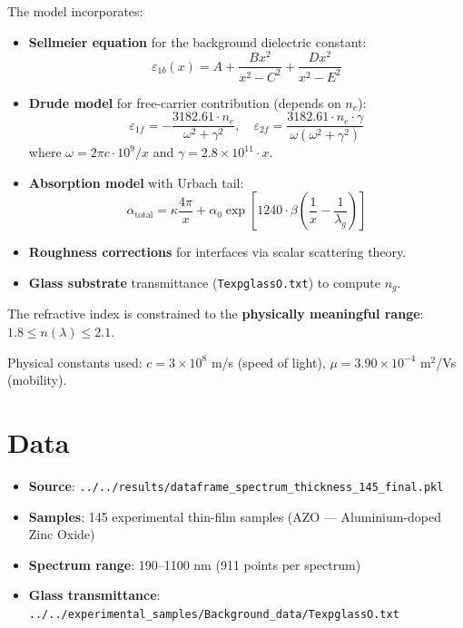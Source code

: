 \documentclass[11pt,a4paper]{article}
\begin{document}
The model incorporates:
\begin{itemize}
    \item \textbf{Sellmeier equation} for the background dielectric constant:
    \begin{equation*}
        \varepsilon_{1b}(x) = A + \frac{B x^2}{x^2 - C^2} + \frac{D x^2}{x^2 - E^2}
    \end{equation*}
    \item \textbf{Drude model} for free-carrier contribution (depends on $n_e$):
    \begin{equation*}
        \varepsilon_{1f} = -\frac{3182.61 \cdot n_e}{\omega^2 + \gamma^2}, \quad
        \varepsilon_{2f} = \frac{3182.61 \cdot n_e \cdot \gamma}{\omega(\omega^2 + \gamma^2)}
    \end{equation*}
    where $\omega = 2\pi c \cdot 10^9 / x$ and $\gamma = 2.8 \times 10^{11} \cdot x$.
    \item \textbf{Absorption model} with Urbach tail:
    \begin{equation*}
        \alpha_{\text{total}} = \kappa \frac{4\pi}{x} + \alpha_0 \exp\!\left[1240 \cdot \beta \left(\frac{1}{x} - \frac{1}{\lambda_g}\right)\right]
    \end{equation*}
    \item \textbf{Roughness corrections} for interfaces via scalar scattering theory.
    \item \textbf{Glass substrate} transmittance ({\tt TexpglassO.txt}) to compute $n_g$.
\end{itemize}

The refractive index is constrained to the \textbf{physically meaningful range}: $1.8 \leq n(\lambda) \leq 2.1$.

Physical constants used: $c = 3 \times 10^8$ m/s (speed of light), $\mu = 3.90 \times 10^{-4}$ m$^2$/Vs (mobility).

\section{Data}

\begin{itemize}
    \item \textbf{Source}: {\tt ../../results/dataframe\_spectrum\_thickness\_145\_final.pkl}
    \item \textbf{Samples}: 145 experimental thin-film samples (AZO --- Aluminium-doped Zinc Oxide)
    \item \textbf{Spectrum range}: 190--1100 nm (911 points per spectrum)
    \item \textbf{Glass transmittance}: {\tt ../../experimental\_samples/Background\_data/TexpglassO.txt}
\end{itemize}
\end{document}
